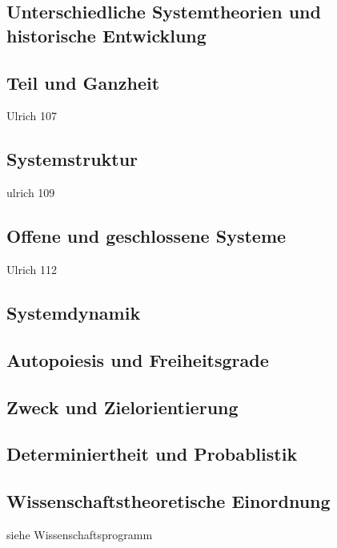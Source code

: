 \documentclass[a4paper,12pt]{article}
\begin{document}
\subsection{Unterschiedliche Systemtheorien und historische Entwicklung}

\subsection{Teil und Ganzheit}
Ulrich 107
\subsection{Systemstruktur}
ulrich 109
\subsection{Offene und geschlossene Systeme}
Ulrich 112
\subsection{Systemdynamik}
\subsection{Autopoiesis und Freiheitsgrade}
\subsection{Zweck und Zielorientierung}
\subsection{Determiniertheit und Probablistik}
\subsection{Wissenschaftstheoretische Einordnung}
siehe Wissenschaftsprogramm%
\end{document}
